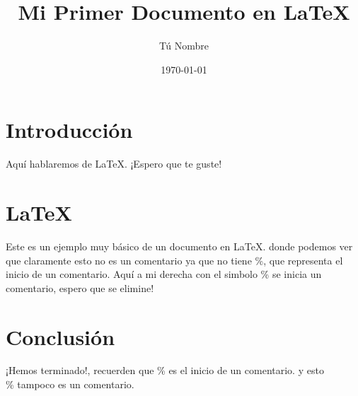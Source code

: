 \documentclass{article}
\begin{document}
 
\title{Mi Primer Documento en LaTeX} 
\author{Tú Nombre} 
\date{\today} 
\maketitle 
\section{Introducción} 
Aquí hablaremos de LaTeX. ¡Espero que te guste!
\section{LaTeX}
Este es un ejemplo muy básico de un documento en \LaTeX{}.
donde podemos ver que claramente esto no es un comentario ya que no tiene \%, que representa el inicio de un comentario.
Aquí a mi derecha con el simbolo \% se inicia un comentario, espero que se elimine! %
\section{Conclusión}
¡Hemos terminado!, recuerden que \% es el inicio de un comentario. y esto \\\% tampoco es un comentario.
\end{document}
